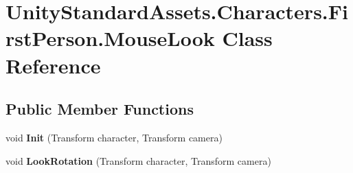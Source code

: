 \hypertarget{class_unity_standard_assets_1_1_characters_1_1_first_person_1_1_mouse_look}{}\section{Unity\+Standard\+Assets.\+Characters.\+First\+Person.\+Mouse\+Look Class Reference}
\label{class_unity_standard_assets_1_1_characters_1_1_first_person_1_1_mouse_look}
\subsection*{Public Member Functions}
\begin{DoxyCompactItemize}
\item 
\mbox{\label{class_unity_standard_assets_1_1_characters_1_1_first_person_1_1_mouse_look_a58d4b5ddd3ed33439f07c53f105bc502}} 
void {\bfseries Init} (Transform character, Transform camera)
\item 
\mbox{\label{class_unity_standard_assets_1_1_characters_1_1_first_person_1_1_mouse_look_a7ed8a0888bed66da925fcddf2be89c89}} 
void {\bfseries Look\+Rotation} (Transform character, Transform camera)
\end{DoxyCompactItemize}
